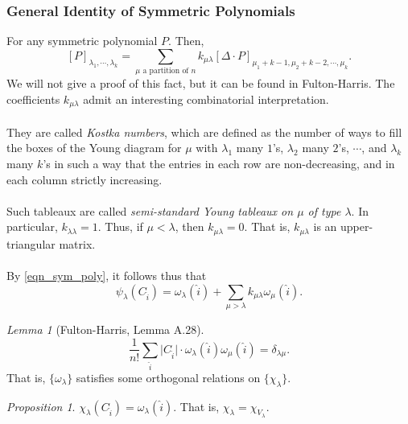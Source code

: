 \documentclass[a4paper]{report}
\theoremstyle{definition}
\theoremstyle{remark}
\theoremstyle{proposition}
\newtheorem{proposition}{Proposition}
\theoremstyle{conjecture}
\theoremstyle{lemma}
\newtheorem{lemma}{Lemma}
\theoremstyle{corollary}
\theoremstyle{exercise}
\theoremstyle{example}
\begin{document}
\subsubsection{General Identity of Symmetric Polynomials}

For any symmetric polynomial $P$. Then, 
\begin{equation}\label{eqn_sym_poly}
    [P]_{\lambda_1,\cdots,\lambda_k} = \sum_{\text{$\mu$ a partition of $n$}} k_{\mu\lambda} [\Delta \cdot P]_{\mu_1+k-1, \mu_2 + k -2, \cdots, \mu_k}.
\end{equation}
We will not give a proof of this fact, but it can be found in Fulton-Harris.
The coefficients $k_{\mu\lambda}$ admit an interesting combinatorial 
interpretation.\\\\ 
They are called \emph{Kostka numbers}, which are defined 
as the number of ways to fill the boxes of the Young diagram for $\mu$ 
with $\lambda_1$ many $1$'s, $\lambda_2$ many $2$'s, $\cdots$, and
$\lambda_k$ many $k$'s in such a way that the entries in each row 
are non-decreasing, and in each column strictly increasing.\\\\
Such tableaux are called \emph{semi-standard Young tableaux on $\mu$ 
of type $\lambda$}. In particular, $k_{\lambda\lambda} = 1$.
Thus, if $\mu < \lambda$, then $k_{\mu\lambda} = 0$. That is,
$k_{\mu\lambda}$ is an upper-triangular matrix.\\\\
By \eqref{eqn_sym_poly}, it follows thus that 
$$\psi_\lambda(C_{\widehat{i}}) = \omega_\lambda(\widehat{i}) + \sum_{\mu > \lambda} k_{\mu\lambda} \omega_\mu(\widehat{i}).$$

\begin{lemma}[Fulton-Harris, Lemma A.28]
    $$\frac{1}{n!}\sum_{\widehat{i}} \vert C_{\widehat{i}}\vert \cdot \omega_\lambda(\widehat{i}) \omega_\mu(\widehat{i}) = \delta_{\lambda\mu}.$$
    That is, $\lbrace \omega_\lambda\rbrace$ satisfies some orthogonal 
    relations on $\lbrace \chi_\lambda\rbrace$.
\end{lemma}

\begin{proposition}
    $\chi_\lambda(C_{\widehat{i}}) = \omega_\lambda(\widehat{i})$. 
    That is, $\chi_\lambda = \chi_{V_\lambda}$.
\end{proposition}
\end{document}
